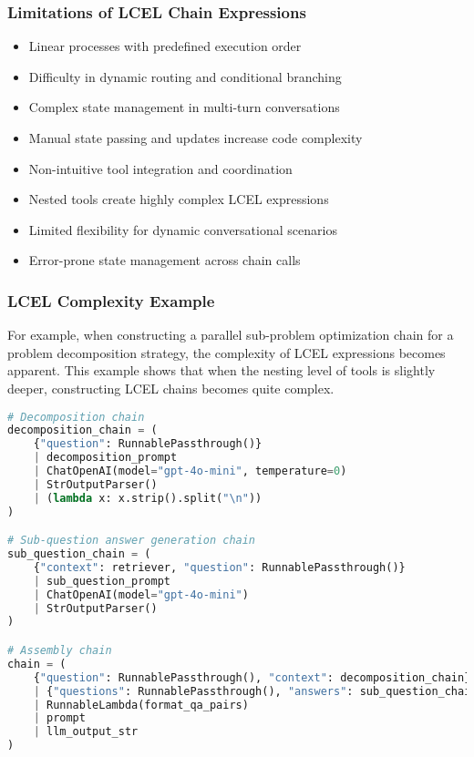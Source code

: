 \begin{frame}[fragile]\frametitle{Limitations of LCEL Chain Expressions}
      \begin{itemize}
        \item Linear processes with predefined execution order
        \item Difficulty in dynamic routing and conditional branching
        \item Complex state management in multi-turn conversations
        \item Manual state passing and updates increase code complexity
        \item Non-intuitive tool integration and coordination
        \item Nested tools create highly complex LCEL expressions
        \item Limited flexibility for dynamic conversational scenarios
        \item Error-prone state management across chain calls
      \end{itemize}
\end{frame}

\begin{frame}[fragile]\frametitle{LCEL Complexity Example}

For example, when constructing a parallel sub-problem optimization chain for a problem decomposition strategy, the complexity of LCEL expressions becomes apparent. This example shows that when the nesting level of tools is slightly deeper, constructing LCEL chains becomes quite complex.

      \begin{lstlisting}[language=Python, basicstyle=\tiny]
# Decomposition chain
decomposition_chain = (
    {"question": RunnablePassthrough()}
    | decomposition_prompt
    | ChatOpenAI(model="gpt-4o-mini", temperature=0)
    | StrOutputParser()
    | (lambda x: x.strip().split("\n"))
)

# Sub-question answer generation chain
sub_question_chain = (
    {"context": retriever, "question": RunnablePassthrough()}
    | sub_question_prompt
    | ChatOpenAI(model="gpt-4o-mini")
    | StrOutputParser()
)

# Assembly chain
chain = (
    {"question": RunnablePassthrough(), "context": decomposition_chain}
    | {"questions": RunnablePassthrough(), "answers": sub_question_chain.map()}
    | RunnableLambda(format_qa_pairs)
    | prompt
    | llm_output_str
)
      \end{lstlisting}
\end{frame}

